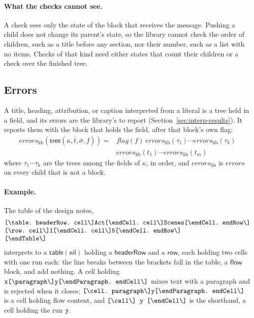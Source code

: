 \documentclass[11pt]{article}
\numberwithin{equation}{section}
\newcommand{\kw}[1]{\ensuremath{\mathsf{#1}}}
\newcommand{\str}[1]{\ensuremath{\text{\texttt{#1}}}}
\newcommand{\bs}{\textbackslash}
\begin{document}
\paragraph{What the checks cannot see.}
A check sees only the state of the block that receives the message.  Pushing
a child does not change its parent's state, so the library cannot check
the order of children, such as a title before any section, nor their
number, such as a list with no items.  Checks of that kind need either
states that count their children or a check over the finished tree.

\subsection{Errors}

A title, heading, attribution, or caption interpreted from a literal is a
tree held in a field, and its errors are the library's to report
(Section~\ref{sec:interp-results}).  It reports them with the block that
holds the field, after that block's own flag:
\begin{equation}\label{eq:lib-errors}
\begin{split}
\mathit{errors}_{\mathrm{lib}}(\kw{tree}(\kappa, \bar t, \bar\sigma, f)) ={}&
  \mathit{flag}(f)\
  \mathit{errors}_{\mathrm{lib}}(\tau_1) \cdots
  \mathit{errors}_{\mathrm{lib}}(\tau_k) \\
  & \mathit{errors}_{\mathrm{lib}}(t_1) \cdots \mathit{errors}_{\mathrm{lib}}(t_m)
\end{split}
\end{equation}
where $\tau_1 \cdots \tau_k$ are the trees among the fields of $\kappa$, in
order, and $\mathit{errors}_{\mathrm{lib}}$ is $\mathit{errors}$ on every
child that is not a block.

\paragraph{Example.}
The table of the design notes,
\[
\begin{array}{@{}l@{}}
\str{[\bs{}table.\ headerRow.\ cell\bs]Act[\bs{}endCell.\ cell\bs]Scenes[\bs{}endCell.\ endRow\bs]} \\
\str{[\bs{}row.\ cell\bs]I[\bs{}endCell.\ cell\bs]5[\bs{}endCell.\ endRow\bs]} \\
\str{[\bs{}endTable\bs]}
\end{array}
\]
interprets to a $\kw{table}(\kw{nil})$ holding a $\kw{headerRow}$ and a
$\kw{row}$, each holding two cells with one run each: the line breaks
between the brackets fall in the table, a $\kw{flow}$ block, and add
nothing.  A cell holding $\str{x[\bs{}paragraph\bs]y[\bs{}endParagraph.\
endCell\bs]}$ mixes text with a paragraph and is rejected when it closes;
$\str{[\bs{}cell.\ paragraph\bs]y[\bs{}endParagraph.\ endCell\bs]}$ is a
cell holding flow content, and $\str{[\bs{}cell\bs]\ y\
[\bs{}endCell\bs]}$ is the shorthand, a cell holding the run $\str{y}$.
\end{document}
